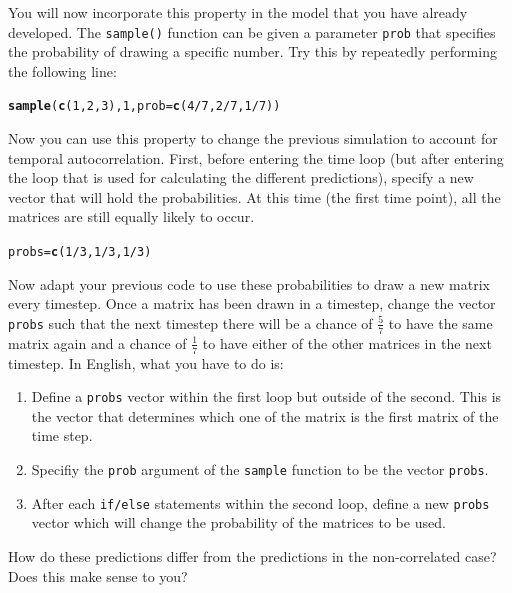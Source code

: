 \documentclass{article}\usepackage[]{graphicx}\usepackage[]{color}
\makeatletter
\newcommand{\hlnum}[1]{\textcolor[rgb]{0.686,0.059,0.569}{#1}}%
\newcommand{\hlopt}[1]{\textcolor[rgb]{0,0,0}{#1}}%
\newcommand{\hlstd}[1]{\textcolor[rgb]{0.345,0.345,0.345}{#1}}%
\newcommand{\hlkwb}[1]{\textcolor[rgb]{0.69,0.353,0.396}{#1}}%
\newcommand{\hlkwc}[1]{\textcolor[rgb]{0.333,0.667,0.333}{#1}}%
\newcommand{\hlkwd}[1]{\textcolor[rgb]{0.737,0.353,0.396}{\textbf{#1}}}%
\newenvironment{kframe}{%
 \def\at@end@of@kframe{}%
 \ifinner\ifhmode%
  \def\at@end@of@kframe{\end{minipage}}%
  \begin{minipage}{\columnwidth}%
 \fi\fi%
 \def\FrameCommand##1{\hskip\@totalleftmargin \hskip-\fboxsep
 \colorbox{shadecolor}{##1}\hskip-\fboxsep
     \hskip-\linewidth \hskip-\@totalleftmargin \hskip\columnwidth}%
 \MakeFramed {\advance\hsize-\width
   \@totalleftmargin\z@ \linewidth\hsize
   \@setminipage}}%
 {\par\unskip\endMakeFramed%
 \at@end@of@kframe}
\newenvironment{knitrout}{}{} %
\makeatother
\begin{document}
You will now incorporate this property in the model that you have already developed. The \texttt{sample()} function can be given a parameter \texttt{prob} that specifies the probability of drawing a specific number. Try this by repeatedly performing the following line:
\begin{knitrout}
\color{fgcolor}\begin{kframe}
\begin{alltt}
\hlkwd{sample}\hlstd{(}\hlkwd{c}\hlstd{(}\hlnum{1}\hlstd{,}\hlnum{2}\hlstd{,}\hlnum{3}\hlstd{),}\hlnum{1}\hlstd{,}\hlkwc{prob}\hlstd{=}\hlkwd{c}\hlstd{(}\hlnum{4}\hlopt{/}\hlnum{7}\hlstd{,}\hlnum{2}\hlopt{/}\hlnum{7}\hlstd{,}\hlnum{1}\hlopt{/}\hlnum{7}\hlstd{))}
\end{alltt}
\end{kframe}
\end{knitrout}
Now you can use this property to change the previous simulation to account for temporal autocorrelation. First, before entering the time loop (but after entering the loop that is used for calculating the different predictions), specify a new vector that will hold the probabilities. At this time (the first time point), all the matrices are still equally likely to occur.
\begin{knitrout}
\color{fgcolor}\begin{kframe}
\begin{alltt}
\hlstd{probs}\hlkwb{=}\hlkwd{c}\hlstd{(}\hlnum{1}\hlopt{/}\hlnum{3}\hlstd{,}\hlnum{1}\hlopt{/}\hlnum{3}\hlstd{,}\hlnum{1}\hlopt{/}\hlnum{3}\hlstd{)}
\end{alltt}
\end{kframe}
\end{knitrout}
Now adapt your previous code to use these probabilities to draw a new matrix every timestep. Once a matrix has been drawn in a timestep, change the vector \texttt{probs} such that the next timestep there will be a chance of $\frac{5}{7}$ to have the same matrix again and a chance of $\frac{1}{7}$ to have either of the other matrices in the next timestep. In English, what you have to do is:

\begin{enumerate}
\item Define a \texttt{probs} vector within the first loop but outside of the second. This is the vector that determines which one of the matrix is the first matrix of the time step.
\item Specifiy the \texttt{prob} argument of the \texttt{sample} function to be the vector \texttt{probs}.
\item After each \texttt{if/else} statements within the second loop, define a new \texttt{probs} vector which will change the probability of the matrices to be used.
\end{enumerate}
How do these predictions differ from the predictions in the non-correlated case? Does this make sense to you?
\end{document}
